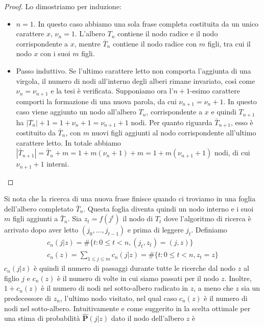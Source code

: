 \documentclass[a4paper,11pt]{book}
\theoremstyle{plain}
\theoremstyle{definition}
\theoremstyle{remark}
\newcommand{\Ph}{\hat{\mathbf{P}}}
\begin{document}
\begin{proof}
	Lo dimostriamo per induzione:
	\begin{itemize}
		\item $n=1$. In questo caso abbiamo una sola frase completa costituita da un unico carattere $x$, $\nu_n =1$. L'albero $T_n$ contiene il nodo radice e il nodo corrispondente a $x$, mentre $\bar{T}_n$ contiene il nodo radice con $m$ figli, tra cui il nodo $x$ con i suoi $m$ figli.
		\item Passo induttivo. Se l'ultimo carattere letto non comporta l'aggiunta di una virgola, il numero di nodi all'interno degli alberi rimane invariato, così come $\nu_n = \nu_{n+1}$ e la tesi è verificata. Supponiamo ora l'$n+1$-esimo carattere comporti la formazione di una nuova parola, da cui $\nu_{n+1} = \nu_n + 1$. In questo caso viene aggiunto un nodo all'albero $T_{n}$, corrispondente a $x$ e quindi $T_{n+1}$ ha $|T_n|+1 = 1+\nu_n+1 = \nu_{n+1}+1$ nodi. Per quanto riguarda $\bar{T}_{n+1}$, esso è costituito da $\bar{T}_n$, con $m$ nuovi figli aggiunti al nodo corrispondente all'ultimo carattere letto. In totale abbiamo $|\bar{T}_{n+1}| = \bar{T}_n+m = 1+m(\nu_n+1)+m = 1+m(\nu_{n+1}+1)$ nodi, di cui $\nu_{n+1}+1$ interni.
	\end{itemize}
\end{proof}
Si nota che la ricerca di una nuova frase finisce quando ci troviamo in una foglia dell'albero completato $\bar{T}_n$. Questa foglia diventa quindi un nodo interno e i suoi $m$ figli aggiunti a $\bar{T}_n$.\newline
Sia $z_t = f(j^t)$ il nodo di $T_t$ dove l'algoritmo di ricerca è arrivato dopo aver letto $(j_0,\ldots,j_{t-1})$ e prima di leggere $j_t$.\newline
Definiamo
\begin{align*}
	c_n(j|z)=\#\{t:0\leq t<n, (j_t,z_t)=(j,z)\}\\
	c_n(z)=\sum_{1\leq j\leq m}{c_n(j|z)}=\#\{t:0\leq t<n,z_t=z\}
\end{align*}
$c_n(j|z)$ è quindi il numero di passaggi durante tutte le ricerche dal nodo $z$ al figlio $j$ e $c_n(z)$ è il numero di volte in cui siamo passati per il nodo $z$.\newline
Inoltre, $1+c_n(z)$ è il numero di nodi nel sotto-albero radicato in $z$, a meno che $z$ sia un predecessore di $z_n$, l'ultimo nodo visitato, nel qual caso $c_n(z)$ è il numero di nodi nel sotto-albero. \newline
Intuitivamente e come suggerito in \cite{algoet1992} la scelta ottimale per una stima di probabilità $\Ph(j|z)$ dato il nodo dell'albero $z$ è
\end{document}
